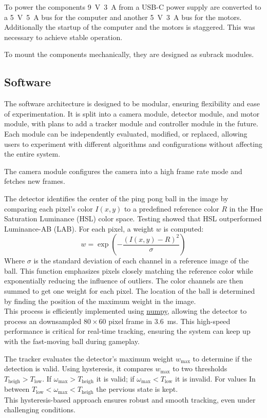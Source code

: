 \documentclass[
    parskip=half, 
    twoside=false,
    twocolumn=true,
    fontsize=12pt,
]{scrarticle}
\begin{document}
To power the components \SI{9}{V}~\SI{3}{A} from a USB-C power supply are converted to a \SI{5}{V}~\SI{5}{A} bus for the computer and another \SI{5}{V}~\SI{3}{A} bus for the motors.
Additionally the startup of the computer and the motors is staggered.
This was necessary to achieve stable operation.

To mount the components mechanically, they are designed as subrack modules.

\subsection*{Software}
The software architecture is designed to be modular, ensuring flexibility and ease of experimentation. It is split into a camera module, detector module, and motor module, with plans to add a tracker module and controller module in the future. Each module can be independently evaluated, modified, or replaced, allowing users to experiment with different algorithms and configurations without affecting the entire system.

The camera module configures the camera into a high frame rate mode and fetches new frames.

The detector identifies the center of the ping pong ball in the image by comparing each pixel's color $I(x,y)$ to a predefined reference color $R$ in the Hue Saturation Luminance (HSL) color space.
Testing showed that HSL outperformed Luminance-AB (LAB).
For each pixel, a weight $w$ is computed:
$$w = \exp\left(- \frac{(I(x,y)-R)^2}{\sigma}\right)$$
Where $\sigma$ is the standard deviation of each channel in a reference image of the ball.
This function emphasizes pixels closely matching the reference color while exponentially reducing the influence of outliers.
The color channels are then summed to get one weight for each pixel.
The location of the ball is determined by finding the position of the maximum weight in the image.\\
This process is efficiently implemented using \href{https://numpy.org/}{numpy}, allowing the detector to process an downsampled $80\times 60$ pixel frame in \SI{3.6}{ms}.
This high-speed performance is critical for real-time tracking, ensuring the system can keep up with the fast-moving ball during gameplay.

The tracker evaluates the detector's maximum weight $w_\text{max}$ to determine if the detection is valid.
Using hysteresis, it compares $w_\text{max}$ to two thresholds $T_\text{heigh} > T_\text{low}$.
If $\omega_\text{max}>T_\text{heigh}$ it is valid; if $\omega_\text{max}<T_\text{low}$ it is invalid.
For values In between $T_\text{low}<\omega_\text{max}<T_\text{heigh}$ the pervious state is kept.\\
This hysteresis-based approach ensures robust and smooth tracking, even under challenging conditions. 
\end{document}
